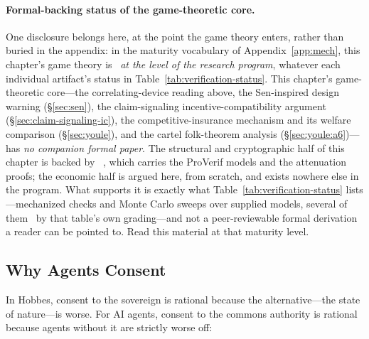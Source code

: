 \documentclass[11pt,a4paper]{article}
\theoremstyle{definition}
\theoremstyle{remark}
\begin{document}
\paragraph{Formal-backing status of the game-theoretic core.}
One disclosure belongs here, at the point the game theory enters, rather than buried in the appendix: in the maturity vocabulary of Appendix~\ref{app:mech}, this chapter's game theory is \SpecOnly\ \emph{at the level of the research program}, whatever each individual artifact's status in Table~\ref{tab:verification-status}. This chapter's game-theoretic core---the correlating-device reading above, the Sen-inspired design warning (\S\ref{sec:sen}), the claim-signaling incentive-compatibility argument (\S\ref{sec:claim-signaling-ic}), the competitive-insurance mechanism and its welfare comparison (\S\ref{sec:youle}), and the cartel folk-theorem analysis (\S\ref{sec:youle:a6})---has \emph{no companion formal paper}. The structural and cryptographic half of this chapter is backed by ~, which carries the ProVerif models and the attenuation proofs; the economic half is argued here, from scratch, and exists nowhere else in the program. What supports it is exactly what Table~\ref{tab:verification-status} lists---mechanized checks and Monte Carlo sweeps over supplied models, several of them \Partial\ by that table's own grading---and not a peer-reviewable formal derivation a reader can be pointed to. Read this material at that maturity level.

\subsection{Why Agents Consent}\label{sec:why-consent}

In Hobbes, consent to the sovereign is rational because the alternative---the state of nature---is worse. For AI agents, consent to the commons authority is rational because agents without it are strictly worse off:
\end{document}
